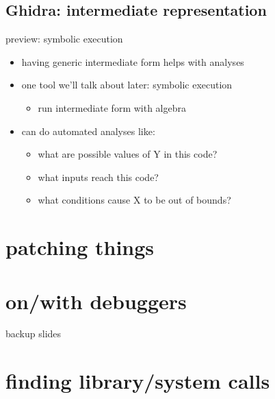 \subsection{Ghidra: intermediate representation}


\begin{frame}{preview: symbolic execution}
    \begin{itemize}
    \item having generic intermediate form helps with analyses
    \item one tool we'll talk about later: symbolic execution
        \begin{itemize}
        \item run intermediate form with algebra
        \end{itemize}
    \vspace{.5cm}
    \item can do automated analyses like:
        \begin{itemize}
        \item what are possible values of Y in this code?
        \item what inputs reach this code?
        \item what conditions cause X to be out of bounds?
        \end{itemize}
    \vspace{.5cm}
    \end{itemize}
\end{frame}


\section{patching things}


\section{on/with debuggers}


\begin{frame}{backup slides}
\end{frame}
\section{finding library/system calls}

